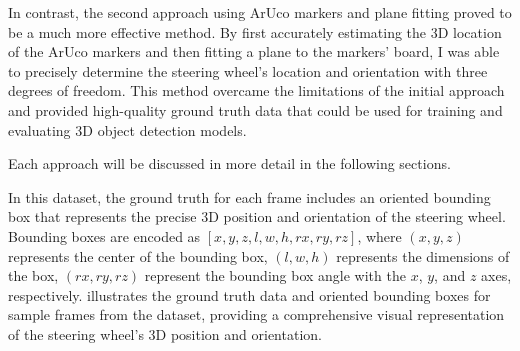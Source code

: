 In contrast, the second approach using ArUco markers \cite{opencv_aruco_detection} 
and plane fitting proved to be a much more effective method. 
By first accurately estimating the 3D location of the ArUco markers and then fitting a 
plane to the markers' board, I was able to precisely determine the 
steering wheel's location and orientation with three degrees of freedom. 
This method overcame the limitations of the initial approach and 
provided high-quality ground truth data that could be used for 
training and evaluating 3D object detection models.

Each approach will be discussed in more detail in the following sections.

In this dataset, the ground truth for each frame includes an 
oriented bounding box that represents the precise 3D position 
and orientation of the steering wheel. Bounding boxes are 
encoded as \([x, y, z, l, w, h, rx, ry, rz]\), 
where \((x, y, z)\) represents the center of the bounding box, 
\((l, w, h)\) represents the dimensions of the box, 
\((rx, ry, rz)\) represent the bounding box angle with 
the \(x\), \(y\), and \(z\) axes, respectively. 
 illustrates the ground truth data and oriented 
bounding boxes for sample frames from the dataset, 
providing a comprehensive visual representation of the 
steering wheel's 3D position and orientation.

